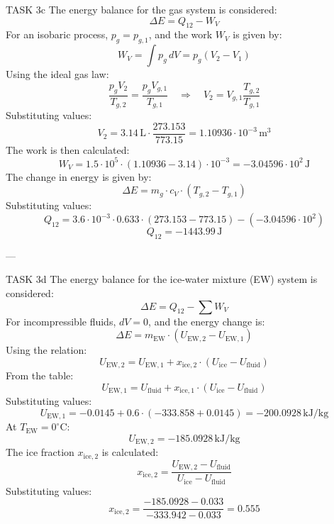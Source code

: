 TASK 3c  
The energy balance for the gas system is considered:  
\[
\Delta E = Q_{12} - W_V
\]  
For an isobaric process, \( p_g = p_{g,1} \), and the work \( W_V \) is given by:  
\[
W_V = \int p_g \, dV = p_g (V_2 - V_1)
\]  
Using the ideal gas law:  
\[
\frac{p_g V_2}{T_{g,2}} = \frac{p_g V_{g,1}}{T_{g,1}} \quad \Rightarrow \quad V_2 = V_{g,1} \frac{T_{g,2}}{T_{g,1}}
\]  
Substituting values:  
\[
V_2 = 3.14 \, \text{L} \cdot \frac{273.153}{773.15} = 1.10936 \cdot 10^{-3} \, \text{m}^3
\]  
The work is then calculated:  
\[
W_V = 1.5 \cdot 10^5 \cdot (1.10936 - 3.14) \cdot 10^{-3} = -3.04596 \cdot 10^2 \, \text{J}
\]  
The change in energy is given by:  
\[
\Delta E = m_g \cdot c_V \cdot (T_{g,2} - T_{g,1})
\]  
Substituting values:  
\[
Q_{12} = 3.6 \cdot 10^{-3} \cdot 0.633 \cdot (273.153 - 773.15) - (-3.04596 \cdot 10^2)
\]  
\[
Q_{12} = -1443.99 \, \text{J}
\]  

---

TASK 3d  
The energy balance for the ice-water mixture (EW) system is considered:  
\[
\Delta E = Q_{12} - \sum W_V
\]  
For incompressible fluids, \( dV = 0 \), and the energy change is:  
\[
\Delta E = m_{\text{EW}} \cdot (U_{\text{EW},2} - U_{\text{EW},1})
\]  
Using the relation:  
\[
U_{\text{EW},2} = U_{\text{EW},1} + x_{\text{ice},2} \cdot (U_{\text{ice}} - U_{\text{fluid}})
\]  
From the table:  
\[
U_{\text{EW},1} = U_{\text{fluid}} + x_{\text{ice},1} \cdot (U_{\text{ice}} - U_{\text{fluid}})
\]  
Substituting values:  
\[
U_{\text{EW},1} = -0.0145 + 0.6 \cdot (-333.858 + 0.0145) = -200.0928 \, \text{kJ/kg}
\]  
At \( T_{\text{EW}} = 0^\circ\text{C} \):  
\[
U_{\text{EW},2} = -185.0928 \, \text{kJ/kg}
\]  
The ice fraction \( x_{\text{ice},2} \) is calculated:  
\[
x_{\text{ice},2} = \frac{U_{\text{EW},2} - U_{\text{fluid}}}{U_{\text{ice}} - U_{\text{fluid}}}
\]  
Substituting values:  
\[
x_{\text{ice},2} = \frac{-185.0928 - 0.033}{-333.942 - 0.033} = 0.555
\]